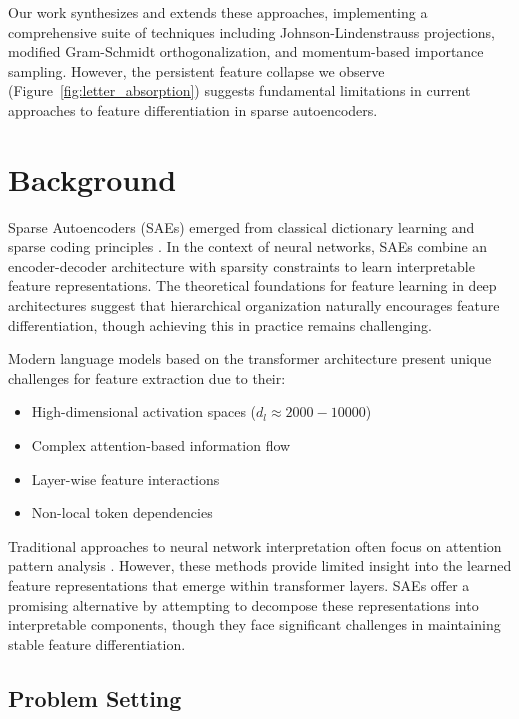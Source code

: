 \documentclass{article} %
\begin{document}
Our work synthesizes and extends these approaches, implementing a comprehensive suite of techniques including Johnson-Lindenstrauss projections, modified Gram-Schmidt orthogonalization, and momentum-based importance sampling. However, the persistent feature collapse we observe (Figure~\ref{fig:letter_absorption}) suggests fundamental limitations in current approaches to feature differentiation in sparse autoencoders.

\section{Background}
\label{sec:background}

Sparse Autoencoders (SAEs) emerged from classical dictionary learning and sparse coding principles \cite{Rubinstein2010DictionariesFS}. In the context of neural networks, SAEs combine an encoder-decoder architecture with sparsity constraints to learn interpretable feature representations. The theoretical foundations for feature learning in deep architectures \cite{Bengio2007LearningDA} suggest that hierarchical organization naturally encourages feature differentiation, though achieving this in practice remains challenging.

Modern language models based on the transformer architecture \cite{vaswani2017attention} present unique challenges for feature extraction due to their:
\begin{itemize}
    \item High-dimensional activation spaces ($d_l \approx 2000-10000$)
    \item Complex attention-based information flow
    \item Layer-wise feature interactions
    \item Non-local token dependencies
\end{itemize}

Traditional approaches to neural network interpretation often focus on attention pattern analysis \cite{bahdanau2014neural}. However, these methods provide limited insight into the learned feature representations that emerge within transformer layers. SAEs offer a promising alternative by attempting to decompose these representations into interpretable components, though they face significant challenges in maintaining stable feature differentiation.

\subsection{Problem Setting}
\label{subsec:problem_setting}
\end{document}
